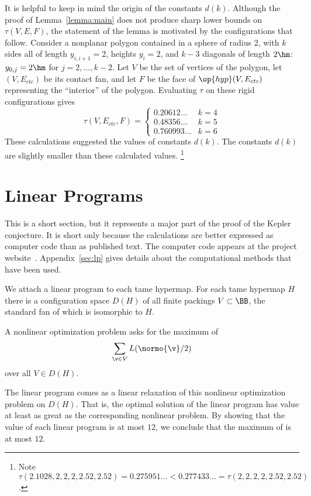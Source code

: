 \begin{remark}
  It is helpful to keep in mind the origin of the constants $d(k)$.
  Although the proof of Lemma~\ref{lemma:main} does not produce sharp
  lower bounds on $\tau(V,E,F)$, the statement of the lemma is
  motivated by the configurations that follow.  Consider a nonplanar
  polygon contained in a sphere of radius $2$, with $k$ sides all of
  length $y_{i,i+1}=2$, heights $y_i=2$, and $k-3$ diagonals of length
  $2\hm$: $y_{0,j}=2\hm$ for $j=2,\ldots,k-2$.  Let $V$ be the set of
  vertices of the polygon, let $(V,E_{ctc})$ be its contact fan, and
  let $F$ be the face of $\op{hyp}(V,E_{ctc})$ representing the
  ``interior'' of the polygon.  Evaluating $\tau$ on these rigid
  configurations gives
\[ 
\tau(V,E_{ctc},F) = 
\begin{cases}
0.20612\ldots & k=4\\
0.48356\ldots & k=5\\
0.760993\ldots &k=6
\end{cases}
\] 
These calculations suggested the values of constants $d(k)$.  The
constants $d(k)$ are slightly smaller than these calculated values.%
\footnote{Note $\tau(2.1028,2,2,2,2.52,2.52) = 0.275951\ldots <
  0.277433\ldots = \tau(2,2,2,2,2.52,2.52)$.}  %
%
%
\end{remark}


\section{Linear Programs}

This is a short section, but it represents a major part of the proof
of the Kepler conjecture.  It is short only because the calculations
are better expressed as computer code than as published text.  The
computer code appears at the project
website~\cite{website:FlyspeckProject}.  Appendix~\ref{sec:lp} gives
details about the computational methods that have been used.

We attach a linear program to each tame hypermap.  For each tame
hypermap $H$ there is a configuration space $D(H)$ of all finite
packings $V\subset \BB$,  the standard fan of which is isomorphic to $H$.
%
%

A nonlinear optimization problem asks for the maximum of
\begin{equation}\label{eqn:L2}
\sum_{\v\in V} L(\normo{\v}/2)
\end{equation}
over all $V\in D(H)$.

The linear program comes as a linear relaxation of this nonlinear
optimization problem on $D(H)$. That is, the optimal solution of the
linear program has value at least as great as the corresponding
nonlinear problem.  By showing that the value of each linear program
is at most $12$, we conclude that the maximum of  is at
most $12$.




